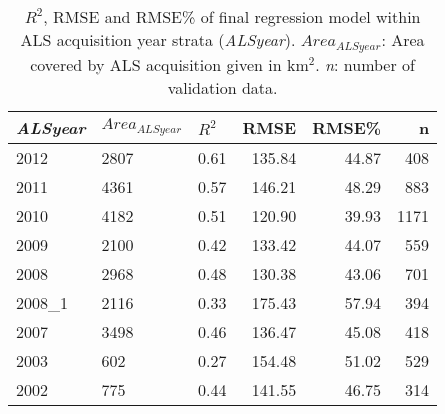 \begin{table}[ht]
	\centering
	\caption{$R^2$, RMSE and RMSE\% of final regression model within ALS acquisition year strata (\textit{ALSyear}). $Area_{ALSyear}$: Area covered by ALS acquisition given in km$^2$. \textit{n}: number of validation data.}
	\label{tab:adj_r2_within}
	\begin{tabular}{lllrrr}
		\hline
		\textit{ALSyear} & $Area_{ALSyear}$ & $R^2$ & RMSE & RMSE\% & n \\ 
		\hline
 2012 & 2807   & 0.61 & 135.84 & 44.87 & 408 \\ 
 2011 & 4361  & 0.57 & 146.21 & 48.29 & 883 \\ 
 2010 & 4182 & 0.51 & 120.90 & 39.93 & 1171 \\ 
 2009 & 2100 & 0.42 & 133.42 & 44.07 & 559 \\ 
 2008 & 2968 & 0.48 & 130.38 & 43.06 & 701 \\ 
 2008\_1 & 2116 & 0.33 & 175.43 & 57.94 & 394 \\ 
 2007 & 3498 & 0.46 & 136.47 & 45.08 & 418 \\ 
 2003 & 602 & 0.27 & 154.48 & 51.02 & 529 \\ 
 2002 & 775 & 0.44 & 141.55 & 46.75 & 314 \\ 
		\hline
\hline
\end{tabular}
\end{table}

